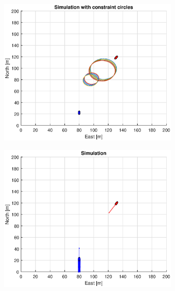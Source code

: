 \begin{figure}[!b]
\begin{subfigure}[b]{0.499\textwidth}
    \end{subfigure}
    \hfill
    \\
    \begin{subfigure}[b]{0.49\textwidth}
        \centering
        \includegraphics[width=\textwidth]{Images/Figures/sving_GW/Simple1_f1_Frame2}
    \end{subfigure}
    \hfill
    \begin{subfigure}[b]{0.499\textwidth}
        \centering
        \includegraphics[width=\textwidth]{Images/Figures/sving_GW/Simple1_f600_Frame2}

\end{subfigure}
\end{figure}
